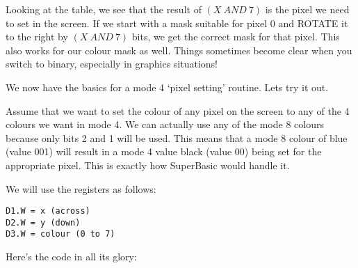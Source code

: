 Looking at the table, we see that the result of $(X~AND~7)$ is the
    pixel we need to set in the screen. If we start with a mask suitable for
    pixel 0 and ROTATE it to the right by $(X~AND~7)$ bits, we get the correct
    mask for that pixel. This also works for our colour mask as well. Things
    sometimes become clear when you switch to binary, especially in graphics
    situations!

We now have the basics for a mode 4 `pixel setting' routine. Lets
    try it out.

Assume that we want to set the colour of any pixel on the screen to
    any of the 4 colours we want in mode 4. We can actually use any of the
    mode 8 colours because only bits 2 and 1 will be used. This means that a
    mode 8 colour of blue (value 001) will result in a mode 4 value black
    (value 00) being set for the appropriate pixel. This is exactly how
    SuperBasic would handle it.

We will use the registers as follows:

\begin{lstlisting}[firstnumber=1,]
D1.W = x (across)
D2.W = y (down)
D3.W = colour (0 to 7)
\end{lstlisting}

Here's the code in all its glory:


